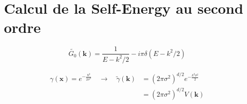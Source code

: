 \section{Calcul de la Self-Energy au second ordre}



\begin{equation}
\widetilde{G_0}(\mathbf{k})=\frac{1}{E-k^2/2}-i \pi \delta(E-k^2/2)
\end{equation}

\begin{align}
\gamma(\mathbf{x})=e^{-\frac{\mathrm{x}^2}{2\sigma^2}} \quad \rightarrow \quad \tilde{\gamma}(\mathbf{k}) &= (2\pi \sigma^2)^{d/2} e^{-\frac{k^2\sigma^2}{2}} \\
&= (2\pi \sigma^2)^{d/2} V(\mathbf{k})
\end{align}

